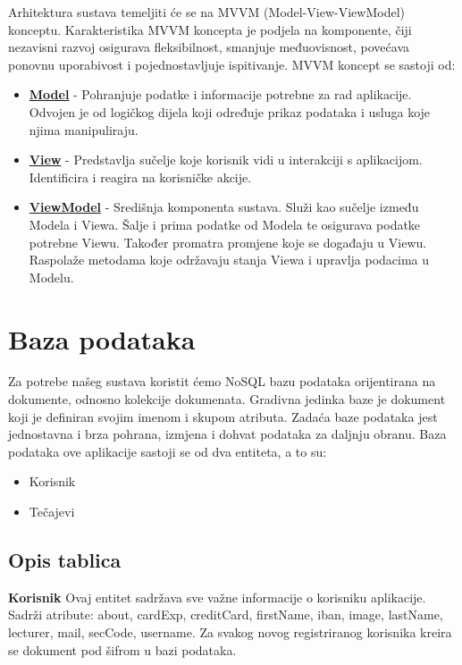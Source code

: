 		Arhitektura sustava temeljiti će se na MVVM (Model-View-ViewModel) konceptu. Karakteristika MVVM koncepta je podjela na komponente, čiji nezavisni razvoj osigurava fleksibilnost, smanjuje međuovisnost, povećava ponovnu uporabivost i pojednostavljuje ispitivanje. \newline
		MVVM koncept se sastoji od:
	\begin{itemize}
		\item \textbf{\underline{Model}} - Pohranjuje podatke i informacije potrebne za rad aplikacije. Odvojen je od logičkog dijela koji određuje prikaz podataka i usluga koje njima manipuliraju.
		\item \textbf{\underline{View}} - Predstavlja sučelje koje korisnik vidi u interakciji s aplikacijom. Identificira i reagira na korisničke akcije.
		\item \textbf{\underline{ViewModel}} - Središnja komponenta sustava. Služi kao sučelje između Modela i Viewa. Šalje i prima podatke od Modela te osigurava podatke potrebne Viewu. Također promatra promjene koje se događaju u Viewu. Raspolaže metodama koje održavaju stanja Viewa i upravlja podacima u Modelu.
	\end{itemize}
		
	\eject

				
		\section{Baza podataka}
			
			\text Za potrebe našeg sustava koristit ćemo NoSQL bazu podataka orijentirana na dokumente, odnosno kolekcije dokumenata. Gradivna jedinka baze je dokument koji je definiran svojim imenom i skupom atributa. Zadaća baze podataka jest jednostavna i brza pohrana, izmjena i dohvat podataka za daljnju obranu. Baza podataka ove aplikacije sastoji se od dva entiteta, a to su:
			
			\begin{itemize}
				\item Korisnik
				\item Tečajevi
			\end{itemize}
		
			\subsection{Opis tablica}
			

				\textbf{Korisnik} \text    Ovaj entitet sadržava sve važne informacije o korisniku aplikacije. Sadrži atribute: about, cardExp, creditCard, firstName, iban, image, lastName, lecturer, mail, secCode, username. Za svakog novog registriranog korisnika kreira se dokument pod šifrom u bazi podataka.
				
